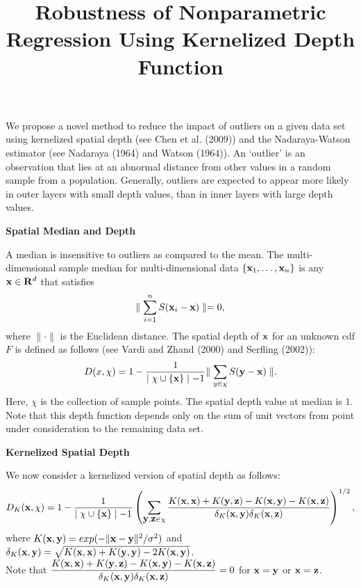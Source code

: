 \documentclass[11pt]{article}
\newcommand{\xvec}{\mbox{\bf x}}
\newcommand{\yvec}{\mbox{\bf y}}
\newcommand{\zvec}{\mbox{\bf z}}
\begin{document}
\title{\vspace{-0.25in} Robustness of Nonparametric Regression Using Kernelized Depth Function}
\author{}
\maketitle
\begin{flushleft}

\large

We propose a novel method to reduce the impact of outliers on a given data set using kernelized spatial depth (see Chen et al. (2009)) and the Nadaraya-Watson estimator (see Nadaraya (1964) and Watson (1964)). An `outlier' is an observation that lies at an abnormal distance from other values in a random sample from a population. Generally, outliers are expected to appear more likely in outer layers with small depth values, than in inner layers with large depth values. 

\vspace{0.1in}
\textbf{Spatial Median and Depth}
\vspace{0.1in}

A median is insensitive to outliers as compared to the mean. The multi-dimensional sample median for multi-dimensional data $\{\xvec_1,\ldots,\xvec_n\}$  is any $\xvec \in \mathbf{R}^d$ that satisfies
$$ \parallel \displaystyle{\sum\limits_{i=1}^n S(\xvec_i-\xvec)} \parallel =0,$$
where $\parallel \cdot \parallel$ is the Euclidean distance.
The spatial depth of $\xvec$ for an unknown cdf $F$ is defined as follows (see Vardi and Zhand (2000) and Serfling (2002)):
$$ D(x,\chi) = 1-\frac{1}{\mid \chi \cup \{ \xvec \} \mid-1}  \displaystyle{\parallel \sum\limits_{y \in \chi} S(\yvec-\xvec) \parallel}. $$
Here, $\chi$ is the collection of sample points.
The spatial depth value at median is $1$. 
Note that this depth function depends only on the sum of unit vectors from point under consideration to the remaining data set.

\vspace{0.1in}
\textbf{Kernelized Spatial Depth}
\vspace{0.1in}

We now consider a kernelized version of spatial depth as follows:
$$ D_K(\xvec,\chi)= 1-\frac{1}{\mid \chi \cup \{ \xvec \} \mid-1} \left( \displaystyle{ \sum \limits_{\yvec, \zvec \in \chi} \frac{K(\xvec,\xvec)+K(\yvec,\zvec)-K(\xvec,\yvec)-K(\xvec,\zvec)}{\delta_K(\xvec,\yvec) \delta_K(\xvec,\zvec)}}\right)^{1/2},$$ 
where $K(\xvec,\yvec)=exp(-\Vert \xvec-\yvec \Vert^2/\sigma^2)$ and $\delta_K(\xvec,\yvec)=\sqrt{K(\xvec,\xvec)+K(\yvec,\yvec)-2K(\xvec,\yvec)}$. \\ \vspace{0.1in}
Note that $\displaystyle \frac{K(\xvec,\xvec)+K(\yvec,\zvec)-K(\xvec,\yvec)-K(\xvec,\zvec)}{\delta_K(\xvec,\yvec) \delta_K(\xvec,\zvec)}=0$ for $\xvec=\yvec$ or $\xvec=\zvec$.
\vspace{0.1in}


\end{flushleft}
\end{document}
